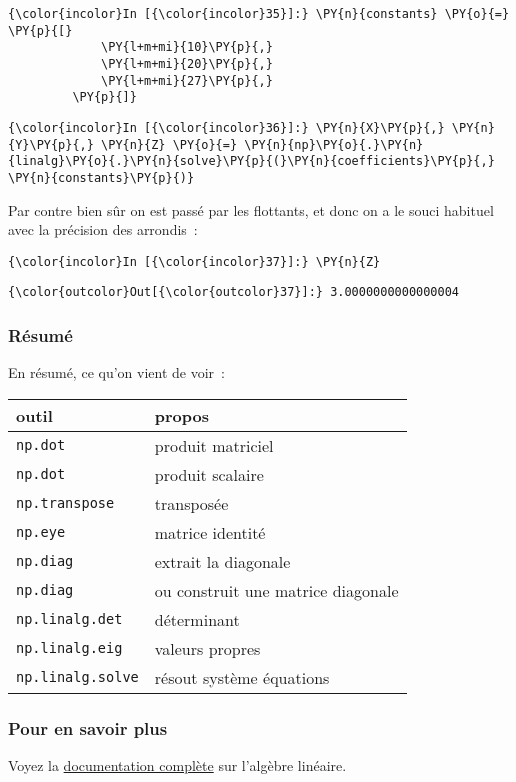     \begin{Verbatim}[commandchars=\\\{\},frame=single,framerule=0.3mm,rulecolor=\color{cellframecolor}]
{\color{incolor}In [{\color{incolor}35}]:} \PY{n}{constants} \PY{o}{=} \PY{p}{[}
             \PY{l+m+mi}{10}\PY{p}{,}
             \PY{l+m+mi}{20}\PY{p}{,}
             \PY{l+m+mi}{27}\PY{p}{,}
         \PY{p}{]}
\end{Verbatim}


    \begin{Verbatim}[commandchars=\\\{\},frame=single,framerule=0.3mm,rulecolor=\color{cellframecolor}]
{\color{incolor}In [{\color{incolor}36}]:} \PY{n}{X}\PY{p}{,} \PY{n}{Y}\PY{p}{,} \PY{n}{Z} \PY{o}{=} \PY{n}{np}\PY{o}{.}\PY{n}{linalg}\PY{o}{.}\PY{n}{solve}\PY{p}{(}\PY{n}{coefficients}\PY{p}{,} \PY{n}{constants}\PY{p}{)}
\end{Verbatim}


    Par contre bien sûr on est passé par les flottants, et donc on a le
souci habituel avec la précision des arrondis~:

    \begin{Verbatim}[commandchars=\\\{\},frame=single,framerule=0.3mm,rulecolor=\color{cellframecolor}]
{\color{incolor}In [{\color{incolor}37}]:} \PY{n}{Z}
\end{Verbatim}


\begin{Verbatim}[commandchars=\\\{\},frame=single,framerule=0.3mm,rulecolor=\color{cellframecolor}]
{\color{outcolor}Out[{\color{outcolor}37}]:} 3.0000000000000004
\end{Verbatim}
            
    \hypertarget{ruxe9sumuxe9}{%
\subsubsection{Résumé}\label{ruxe9sumuxe9}}

    En résumé, ce qu'on vient de voir~:

    \begin{longtable}[]{@{}ll@{}}
\toprule
outil & propos\tabularnewline
\midrule
\endhead
\texttt{np.dot} & produit matriciel\tabularnewline
\texttt{np.dot} & produit scalaire\tabularnewline
\texttt{np.transpose} & transposée\tabularnewline
\texttt{np.eye} & matrice identité\tabularnewline
\texttt{np.diag} & extrait la diagonale\tabularnewline
\texttt{np.diag} & ou construit une matrice diagonale\tabularnewline
\texttt{np.linalg.det} & déterminant\tabularnewline
\texttt{np.linalg.eig} & valeurs propres\tabularnewline
\texttt{np.linalg.solve} & résout système équations\tabularnewline
\bottomrule
\end{longtable}

    \hypertarget{pour-en-savoir-plus}{%
\subsubsection{Pour en savoir plus}\label{pour-en-savoir-plus}}

Voyez la
\href{https://docs.scipy.org/doc/numpy/reference/routines.linalg.html}{documentation
complète} sur l'algèbre linéaire.


    
    
    
